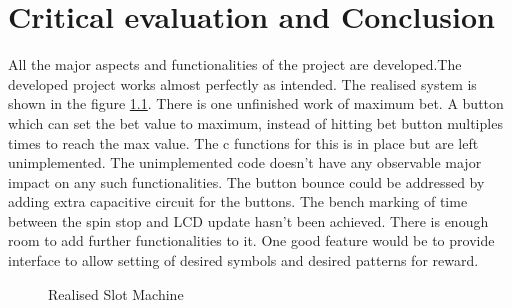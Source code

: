 \documentclass[a4paper,13pt,openany,sffamily]{memoir}
\begin{document}
\chapter {Critical evaluation and Conclusion}
All the major aspects and functionalities of the project are developed.The developed project works almost perfectly as intended. The realised system is shown in the figure \ref{Fig_Slot_Machine_Realised}. There is one unfinished work of maximum bet. A button which can set the bet value to maximum, instead of hitting bet button multiples times to reach the max value. The c functions for this is in place but are left unimplemented. The unimplemented code doesn't have any observable major impact on any such functionalities. The button bounce could be addressed by adding extra capacitive circuit for the buttons. The bench marking of time between the spin stop and LCD update hasn't been achieved. There is enough room to add further functionalities to it. One good feature would be to provide interface to allow setting of desired symbols and desired patterns for reward.   

\begin{figure}[h]
\caption{Realised Slot Machine}
\label{Fig_Slot_Machine_Realised}
\end{figure}
\end{document}
